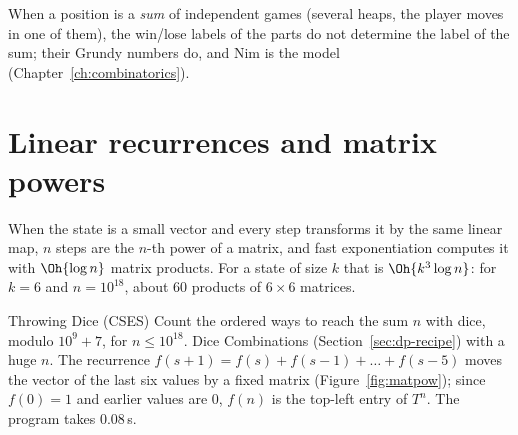 When a position is a \emph{sum} of independent games (several heaps, the player moves in one of them), the win/lose labels of the
parts do not determine the label of the sum; their Grundy numbers do, and Nim is the model (Chapter~\ref{ch:combinatorics}).

\section[Matrix exponentiation]{Linear recurrences and matrix powers \hfill \gold}\label{sec:matexp}

When the state is a small vector and every step transforms it by the same linear map, $n$ steps are the $n$-th power of a matrix,
and fast exponentiation computes it with $\Oh{\log n}$ matrix products. For a state of size $k$ that is $\Oh{k^3 \log n}$: for $k = 6$
and $n = 10^{18}$, about 60 products of $6 \times 6$ matrices.

\begin{problem}{Throwing Dice (CSES)}
Count the ordered ways to reach the sum $n$ with dice, modulo $10^9 + 7$, for $n \le 10^{18}$.
\solution Dice Combinations (Section~\ref{sec:dp-recipe}) with a huge $n$. The recurrence $f(s + 1) = f(s) + f(s - 1) + \dots + f(s -
5)$ moves the vector of the last six values by a fixed matrix (Figure~\ref{fig:matpow}); since $f(0) = 1$ and earlier values are 0,
$f(n)$ is the top-left entry of $T^n$. The program takes 0.08\,s.
\end{problem}

